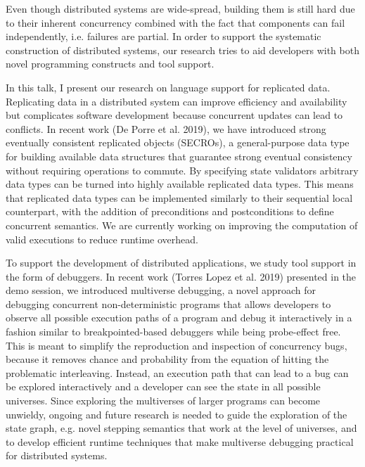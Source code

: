 
Even though distributed systems are wide-spread, building them is still hard due to their inherent concurrency combined with the fact that components can fail independently, i.e. failures are partial.  In order to support the systematic construction of distributed systems, our research tries to aid developers with both novel programming constructs and tool support.

In this talk, I present our research on language support for replicated data. Replicating data in a distributed system can improve efficiency and availability but complicates software development because concurrent updates can lead to conflicts. In recent work (De Porre et al. 2019), we have introduced strong eventually consistent replicated objects (SECROs), a general-purpose data type for building available data structures that guarantee strong eventual consistency without requiring operations to commute. By specifying state validators arbitrary data types can be turned into highly available replicated data types. This means that replicated data types can be implemented similarly to their sequential local counterpart, with the addition of preconditions and postconditions to define concurrent semantics. We are currently working on improving the computation of valid executions to reduce runtime overhead.

To support the development of distributed applications, we study tool support in the form of debuggers. In recent work (Torres Lopez et al. 2019) presented in the demo session, we introduced multiverse debugging, a novel approach for debugging concurrent non-deterministic
programs that allows developers to observe all possible execution paths of a program and debug it interactively in a fashion similar to breakpointed-based debuggers while being probe-effect free.  This is meant to simplify the reproduction and inspection of concurrency bugs, because it removes chance and probability from the equation of hitting the problematic interleaving. Instead, an execution path that can lead to a bug can be explored interactively and a developer can see the state in all possible universes. Since  exploring the multiverses of larger programs can become unwieldy, ongoing and future research is needed to guide the exploration of the state graph, e.g. novel stepping semantics that work at the level of universes, and to develop efficient runtime techniques that make multiverse debugging practical for distributed systems.
